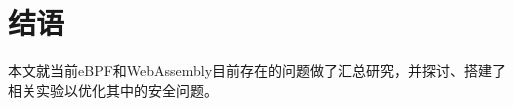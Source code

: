 \section{结语}
\label{section:conclusion}
    本文就当前eBPF和WebAssembly目前存在的问题做了汇总研究，并探讨、搭建了相关实验以优化其中的安全问题。